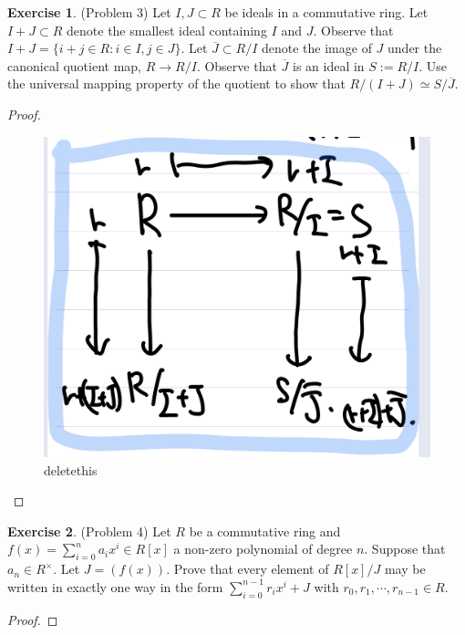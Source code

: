 \documentclass[12pt, psamsfonts]{amsart}
\theoremstyle{definition}
\newtheorem*{exer}{Exercise}
\theoremstyle{remark}
\numberwithin{equation}{section}
\begin{document}
\begin{exer}{(Problem 3)}
  Let $I, J \subset R$ be ideals in a commutative ring.
  Let $I + J \subset R$ denote the smallest ideal containing $I$ and $J$.
  Observe that $I + J = \{ i + j \in R : i \in I, j \in J \}$.
  Let $\overline{J} \subset R / I$ denote the image of $J$ under the canonical quotient map, $R \rightarrow R / I$.
  Observe that $\overline{J}$ is an ideal in $S := R / I$.
  Use the universal mapping property of the quotient to show that $R / (I + J) \simeq S / \overline{J}$.
\end{exer}

\begin{proof}
  \begin{figure}
    \includegraphics[width=.5\linewidth]{problem3_partial_delete.jpeg}
      \caption{deletethis}
    \label{fig:mydelete}
  \end{figure}
\end{proof}

\begin{exer}{(Problem 4)}
  Let $R$ be a commutative ring and $f(x) = \sum_{i=0}^{n} a_ix^i \in R[x]$ a non-zero polynomial of degree $n$.
  Suppose that $a_n \in R^{\times}$.
  Let $J = (f(x))$.
  Prove that every element of $R[x]/J$ may be written in exactly one way in the form $\sum_{i=0}^{n - 1}r_ix^i + J$ with $r_0, r_1, \cdots, r_{n - 1} \in R$.
\end{exer}

\begin{proof}
\end{proof}
\end{document}
